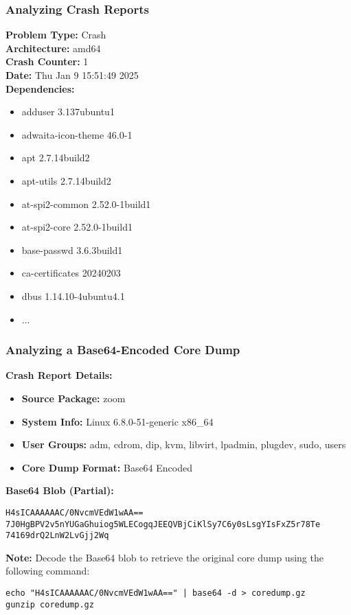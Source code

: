 \begin{frame}[fragile]
\frametitle{Analyzing Crash Reports}

\textbf{Problem Type:} Crash \\
\textbf{Architecture:} amd64 \\
\textbf{Crash Counter:} 1 \\
\textbf{Date:} Thu Jan 9 15:51:49 2025 \\

\textbf{Dependencies:}
\begin{itemize}
    \item adduser 3.137ubuntu1
    \item adwaita-icon-theme 46.0-1
    \item apt 2.7.14build2
    \item apt-utils 2.7.14build2
    \item at-spi2-common 2.52.0-1build1
    \item at-spi2-core 2.52.0-1build1
    \item base-passwd 3.6.3build1
    \item ca-certificates 20240203
    \item dbus 1.14.10-4ubuntu4.1
    \item ...
\end{itemize}

\end{frame}

\begin{frame}[fragile]
\frametitle{Analyzing a Base64-Encoded Core Dump}

\textbf{Crash Report Details:}
\begin{itemize}
    \item \textbf{Source Package:} zoom
    \item \textbf{System Info:} Linux 6.8.0-51-generic x86\_64
    \item \textbf{User Groups:} adm, cdrom, dip, kvm, libvirt, lpadmin, plugdev, sudo, users
    \item \textbf{Core Dump Format:} Base64 Encoded
\end{itemize}

\textbf{Base64 Blob (Partial):}
\begin{verbatim}
H4sICAAAAAAC/0NvcmVEdW1wAA==
7J0HgBPV2v5nYUGaGhuiog5WLECogqJEEQVBjCiKlSy7C6y0sLsgYIsFxZ5r78Te
74169drQ2LnW2LvGjj2Wq
\end{verbatim}

\textbf{Note:} Decode the Base64 blob to retrieve the original core dump using the following command:
\begin{verbatim}
echo "H4sICAAAAAAC/0NvcmVEdW1wAA==" | base64 -d > coredump.gz
gunzip coredump.gz
\end{verbatim}

\end{frame}

